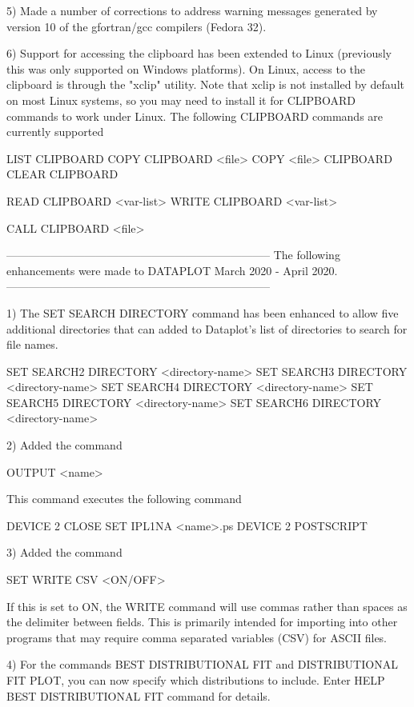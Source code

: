  5) Made a number of corrections to address warning messages generated
    by version 10 of the gfortran/gcc compilers (Fedora 32).

 6) Support for accessing the clipboard has been extended to Linux
    (previously this was only supported on Windows platforms).  On
    Linux, access to the clipboard is through the "xclip" utility.
    Note that xclip is not installed by default on most Linux systems,
    so you may need to install it for CLIPBOARD commands to work under
    Linux.  The following CLIPBOARD commands are currently supported

         LIST CLIPBOARD
         COPY CLIPBOARD <file>
         COPY <file> CLIPBOARD
         CLEAR CLIPBOARD

         READ CLIPBOARD  <var-list>
         WRITE CLIPBOARD <var-list>

         CALL CLIPBOARD  <file>

-----------------------------------------------------------------------
The following enhancements were made to DATAPLOT
March 2020 - April 2020.
-----------------------------------------------------------------------

 1) The SET SEARCH DIRECTORY command has been enhanced to allow five
    additional directories that can added to Dataplot's list of directories
    to search for file names.

       SET SEARCH2 DIRECTORY <directory-name>
       SET SEARCH3 DIRECTORY <directory-name>
       SET SEARCH4 DIRECTORY <directory-name>
       SET SEARCH5 DIRECTORY <directory-name>
       SET SEARCH6 DIRECTORY <directory-name>

 2) Added the command

       OUTPUT  <name>

    This command executes the following command

       DEVICE 2 CLOSE
       SET IPL1NA <name>.ps
       DEVICE 2 POSTSCRIPT

 3) Added the command

       SET WRITE CSV  <ON/OFF>

    If this is set to ON, the WRITE command will use commas rather
    than spaces as the delimiter between fields.  This is primarily
    intended for importing into other programs that may require
    comma separated variables (CSV) for ASCII files.

 4) For the commands BEST DISTRIBUTIONAL FIT and DISTRIBUTIONAL FIT PLOT,
    you can now specify which distributions to include.  Enter
    HELP BEST DISTRIBUTIONAL FIT command for details.

